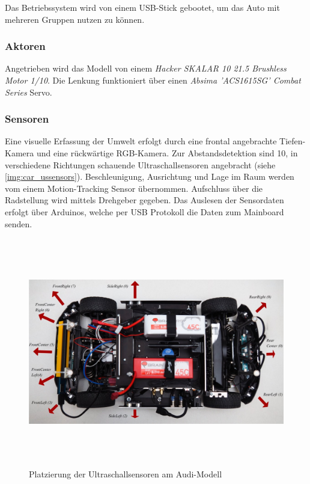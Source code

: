\documentclass[12pt, a4paper]{scrartcl}
\begin{document}
Das Betriebssystem wird von einem USB-Stick gebootet, um das Auto mit mehreren Gruppen nutzen zu können.

\subsubsection{Aktoren}
Angetrieben wird das Modell von einem \emph{Hacker SKALAR 10 21.5 Brushless Motor 1/10}.
Die Lenkung funktioniert über einen \emph{Absima 'ACS1615SG' Combat Series} Servo. 

\subsubsection{Sensoren}
Eine visuelle Erfassung der Umwelt erfolgt durch eine frontal angebrachte Tiefen-Kamera und eine rückwärtige RGB-Kamera. Zur Abstandsdetektion sind 10, in verschiedene Richtungen schauende Ultraschallsensoren angebracht (siehe \autoref{img:car_ussensors}). Beschleunigung, Ausrichtung und Lage im Raum werden vom einem Motion-Tracking Sensor übernommen. Aufschluss über die Radstellung wird mittels Drehgeber gegeben. Das Auslesen der Sensordaten erfolgt über Arduinos, welche per USB Protokoll die Daten zum Mainboard senden.

\begin{figure}[ht]
	\centering
	\includegraphics[width=\textwidth, height=10cm, keepaspectratio]{Bilder/car_sensors.jpg}
	\caption{Platzierung der Ultraschallsensoren am Audi-Modell}
	\label{img:car_ussensors}
\end{figure}
\end{document}
